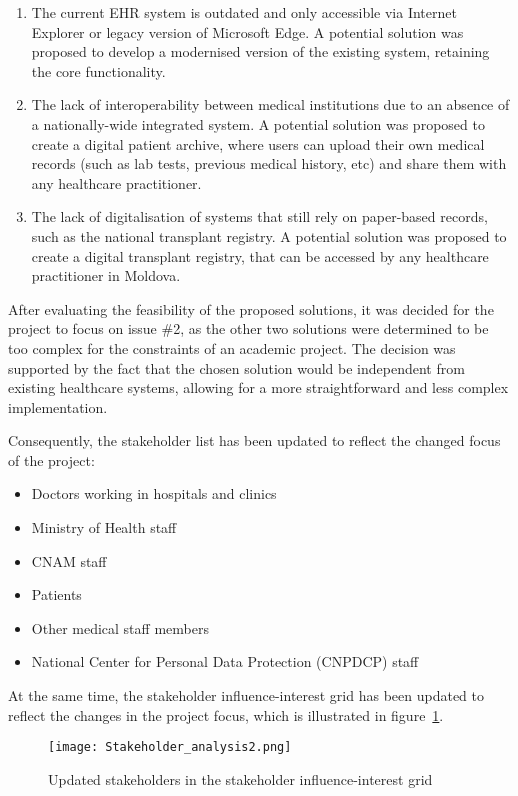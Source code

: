 \begin{enumerate}
    \item The current EHR system is outdated and only accessible via Internet Explorer or legacy version of Microsoft Edge. A potential solution was proposed to develop a modernised version of the existing system, retaining the core functionality. 
    \item The lack of interoperability between medical institutions due to an absence of a nationally-wide integrated system. A potential solution was proposed to create a digital patient archive, where users can upload their own medical records (such as lab tests, previous medical history, etc) and share them with any healthcare practitioner. 
    \item The lack of digitalisation of systems that still rely on paper-based records, such as the national transplant registry. A potential solution was proposed to create a digital transplant registry, that can be accessed by any healthcare practitioner in Moldova.
\end{enumerate}

After evaluating the feasibility of the proposed solutions, it was decided for the project to focus on issue \#2, as the other two solutions were determined to be too complex for the constraints of an academic project. The decision was supported by the fact that the chosen solution would be independent from existing healthcare systems, allowing for a more straightforward and less complex implementation. 

Consequently, the stakeholder list has been updated to reflect the changed focus of the project:
\begin{itemize}
    \item Doctors working in hospitals and clinics
    \item Ministry of Health staff
    \item CNAM staff
    \item Patients
    \item Other medical staff members
    \item National Center for Personal Data Protection (CNPDCP) staff
\end{itemize}

At the same time, the stakeholder influence-interest grid has been updated to reflect the changes in the project focus, which is illustrated in figure~\ref{fig:stakeholder_analysis2}.

\begin{figure}[ht]
    \centering
    \texttt{[image: Stakeholder\_analysis2.png]}
    \caption{Updated stakeholders in the stakeholder influence-interest grid}\label{fig:stakeholder_analysis2}
\end{figure}

